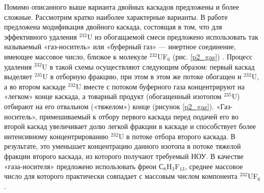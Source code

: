 Помимо описанного выше варианта двойных каскадов предложены и более сложные. Рассмотрим кратко наиболее характерные варианты.
В работе \cite{prusakovKorrekciyaIzotopnogoSostava2008} предложена модификация двойного каскада, состоящая в том, что для эффективного удаления $^{232}$U из обогащаемой смеси предложено использовать так называемый «газ-носитель» или «буферный газ» --- инертное соединение, имеющее массовое число, близкое к молекуле $^{232}$UF$_{6}$ (рис. \ref{p2_gas}) \cite{orlovWayObtainUranium2015, orlovDesublimationPurificationTransporting2017}. Процесс удаления $^{232}$U в такой схемы осуществляют следующим образом: первый каскад выделяет $^{235}$U в отборную фракцию, при этом в этом же потоке обогащен и $^{232}$U, а во втором каскаде $^{232}$U вместе с потоком буферного газа концентрируют на «легком» конце каскада, а товарный продукт (обогащенный изотопом $^{235}$U) отбирают на его отвальном («тяжелом») конце (рисунок \ref{p2_gas}). «Газ-носитель», примешиваемый к отбору первого каскада перед подачей его во второй каскад  увеличивает долю легкой фракции в каскаде и способствует более интенсивному концентрированию $^{232}$U в потоке отбора второго каскада. В результате, это уменьшает концентрацию данного изотопа в потоке тяжелой фракции второго каскада, из которого получают требуемый НОУ. В качестве «газа-носителя» предложено использовать фреон С$_{8}$H$_{3}$F$_{13}$, среднее массовое число для которого практически совпадает с массовым числом компонента $^{232}$UF$_{6}$.

